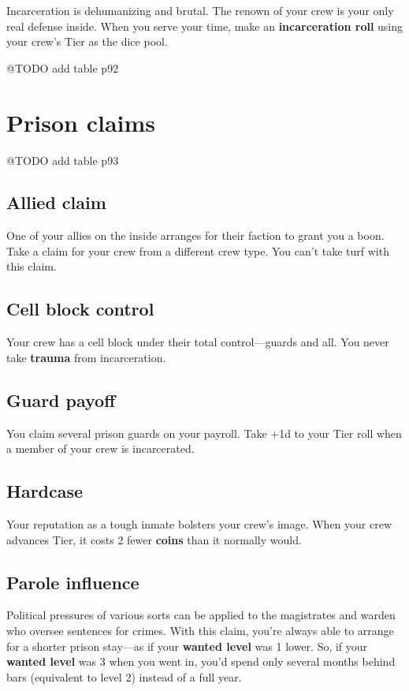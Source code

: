\documentclass[11pt,oneside]{book}
\newcommand{\gameterm}[1]{\textbf{#1}}
\begin{document}
Incarceration is dehumanizing and brutal. The renown of your crew is your only real defense inside. When you serve your time, make an \textbf{incarceration roll} using your crew’s Tier as the dice pool.

@TODO add table p92

\section{Prison claims}

@TODO add table p93

\subsection{Allied claim}

One of your allies on the inside arranges for their faction to grant you a boon. Take a claim for your crew from a different crew type. You can’t take turf with this claim.

\subsection{Cell block control}

Your crew has a cell block under their total control---guards and all. You never take \gameterm{trauma}  from incarceration.

\subsection{Guard payoff}

You claim several prison guards on your payroll. Take +1d to your Tier roll when a member of your crew is incarcerated.

\subsection{Hardcase}

Your reputation as a tough inmate bolsters your crew’s image. When your crew advances Tier, it costs 2 fewer \gameterm{coins}  than it normally would.

\subsection{Parole influence}

Political pressures of various sorts can be applied to the magistrates and warden who oversee sentences for crimes. With this claim, you’re always able to arrange for a shorter prison stay---as if your \gameterm{wanted level}  was 1 lower. So, if your \gameterm{wanted level}  was 3 when you went in, you’d spend only several months behind bars (equivalent to level 2) instead of a full year.
\end{document}
